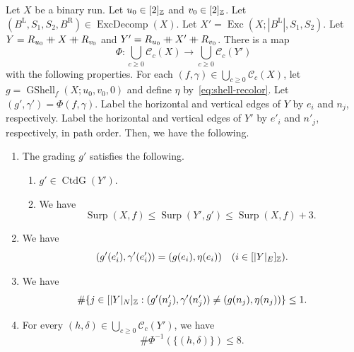 \begin{lemma}\label{lem:exchange}
Let $X$ be a binary run. Let $u_0\in[2]_{\mathbb Z}$ and $v_0\in[2]_{\mathbb Z}$.
Let $(B^{\mathrm L},S_1,S_2,B^{\mathrm R})\in\operatorname{ExcDecomp}(X)$.
Let $X'=\operatorname{Exc}(X;|B^{\mathrm L}|,S_1,S_2)$.
Let $Y=R_{u_0}\mathbin{+\mkern-10mu+} X\mathbin{+\mkern-10mu+} R_{v_0}$ and $Y'=R_{u_0}\mathbin{+\mkern-10mu+} X'\mathbin{+\mkern-10mu+} R_{v_0}$.
There is a map
\[
 \Phi:\bigcup_{c\ge0}\mathcal C_c(X)\longrightarrow
       \bigcup_{c\ge0}\mathcal C_c(Y')
\]
with the following properties.
For each $(f,\gamma)\in\bigcup_{c\ge0}\mathcal C_c(X)$, let $g=\operatorname{GShell}_{f}(X;u_0,v_0,0)$
and define $\eta$ by~\eqref{eq:shell-recolor}.
Let $(g',\gamma')=\Phi(f,\gamma)$.
Label the horizontal and vertical edges of $Y$ by $e_i$ and $n_j$, respectively.
Label the horizontal and vertical edges of $Y'$ by $e'_i$ and $n'_j$, respectively, in path order.
Then, we have the following.

\begin{enumerate}
\item\label{c:exchange-connected} The grading $g'$ satisfies the following.
\begin{enumerate}[label=(\alph*),ref=\theenumi(\alph*)]
\item\label{c:exchange-connectedness} $g'\in\operatorname{CtdG}(Y')$.
\item\label{c:exchange-residual} We have
\[
 \operatorname{Surp}(X,f)\le\operatorname{Surp}(Y',g')
 \le\operatorname{Surp}(X,f)+3.
\]
\end{enumerate}
\item\label{c:exchange-horizontal} We have
\[
 (g'(e'_i),\gamma'(e'_i))=(g(e_i),\eta(e_i))
 \quad(i\in[|Y|_E]_{\mathbb Z}).
\]
\item\label{c:exchange-vertical} We have
\[
 \#\{j\in[|Y|_N]_{\mathbb Z}:(g'(n'_j),\gamma'(n'_j))\ne(g(n_j),\eta(n_j))\}\le1.
\]
\item\label{c:exchange-fibers} For every $(h,\delta)\in\bigcup_{c\ge0}\mathcal C_c(Y')$, we have
\[
 \#\Phi^{-1}(\{(h,\delta)\})\le8.
\]
\end{enumerate}
\end{lemma}
